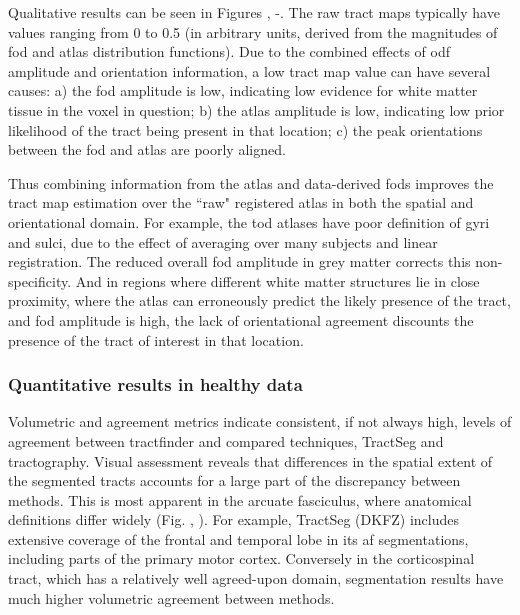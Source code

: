 Qualitative results can be seen in Figures , -.
The raw tract maps typically have values ranging from 0 to 0.5 (in arbitrary units, derived from the magnitudes of \gls{fod} and atlas distribution functions).
Due to the combined effects of \gls{odf} amplitude and orientation information, a low tract map value can have several causes: a) the \gls{fod} amplitude is low, indicating low evidence for white matter tissue in the voxel in question; b) the atlas amplitude is low, indicating low prior likelihood of the tract being present in that location; c) the peak orientations between the \gls{fod} and atlas are poorly aligned.

Thus combining information from the atlas and data-derived \gls{fod}s improves the tract map estimation over the ``raw" registered atlas in both the spatial and orientational domain. For example, the \gls{tod} atlases have poor definition of gyri and sulci, due to the effect of averaging over many subjects and linear registration. The reduced overall \gls{fod} amplitude in grey matter corrects this non-specificity. And in regions where different white matter structures lie in close proximity, where the atlas can erroneously predict the likely presence of the tract, and \gls{fod} amplitude is high, the lack of orientational agreement discounts the presence of the tract of interest in that location.

\subsubsection{Quantitative results in healthy data}

Volumetric and agreement metrics indicate consistent, if not always high, levels of agreement between tractfinder and compared techniques, TractSeg and tractography.
Visual assessment reveals that differences in the spatial extent of the segmented tracts accounts for a large part of the discrepancy between methods.
This is most apparent in the arcuate fasciculus, where anatomical definitions differ widely (Fig. , ).
For example, TractSeg (DKFZ) includes extensive coverage of the frontal and temporal lobe in its \gls{af} segmentations, including parts of the primary motor cortex.
Conversely in the corticospinal tract, which has a relatively well agreed-upon domain, segmentation results have much higher volumetric agreement between methods.

